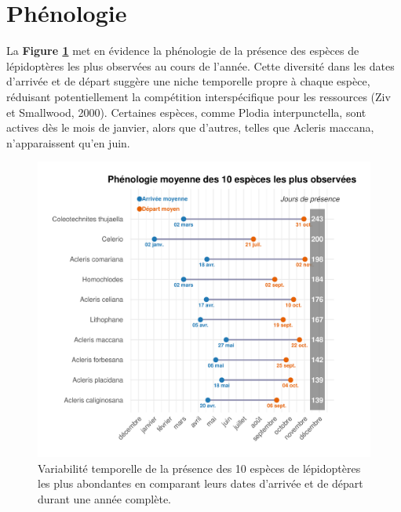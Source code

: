 \documentclass[9pt,twocolumn,twoside,]{pnas-new}
\begin{document}
\section*{Phénologie}\label{phuxe9nologie}

La \textbf{Figure \ref{fig:fig_phenologie}} met en évidence la
phénologie de la présence des espèces de lépidoptères les plus observées
au cours de l'année. Cette diversité dans les dates d'arrivée et de
départ suggère une niche temporelle propre à chaque espèce, réduisant
potentiellement la compétition interspécifique pour les ressources (Ziv
et Smallwood, 2000). Certaines espèces, comme Plodia interpunctella,
sont actives dès le mois de janvier, alors que d'autres, telles que
Acleris maccana, n'apparaissent qu'en juin.

\begin{figure}[H]

{\centering \includegraphics[width=0.8\linewidth]{rapport_final_BIO500_files/figure-latex/fig_phenologie-1} 

}

\caption{\label{fig:fig_phenologie}Variabilité temporelle de la présence des 10 espèces de lépidoptères les plus abondantes en comparant leurs dates d’arrivée et de départ durant une année complète.}\label{fig:fig_phenologie}
\end{figure}
\end{document}
